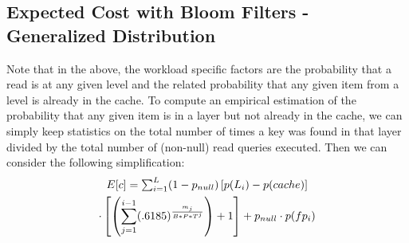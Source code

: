 \documentclass{sig-alternate-05-2015}
\begin{document}
\subsection{Expected Cost with Bloom Filters - Generalized Distribution}
Note that in the above, the workload specific factors are the probability that a read is at any given level and the related probability that any given item from a level is already in the cache. To compute an empirical estimation of the probability that any given item is in a layer but not already in the cache, we can simply keep statistics on the total number of times a key was found in that layer divided by the total number of (non-null) read queries executed. Then we can consider the following simplification:
\begin{multline}
$$E[c] = \sum_{i=1}^{L} (1-p_{null})\left[p(L_i) - p(cache) \right]\\ \cdot \left[ \left(\sum_{j=1}^{i-1} (.6185) ^  {\frac{m_j}{B*P*T^j}}\right) +1 \right] + p_{null} \cdot p(fp_i) $$
\end{multline}
%
%
\end{document}
